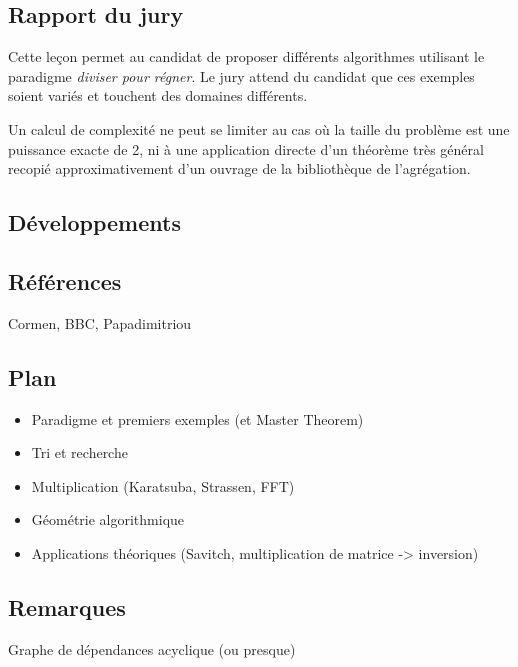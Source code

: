 \documentclass[../../agregation.tex]{subfiles}
\begin{document}

\subsection{Rapport du jury}

\begin{aquote}{}
Cette leçon permet au candidat de proposer différents algorithmes utilisant le paradigme \emph{diviser pour régner}. Le jury attend du candidat que ces exemples soient variés et touchent des domaines différents.

Un calcul de complexité ne peut se limiter au cas où la taille du problème est une puissance exacte de 2, ni à une application directe d'un théorème très général recopié approximativement d'un ouvrage de la bibliothèque de l'agrégation.
\end{aquote}

\subsection{Développements}

\dvts

\subsection{Références}

Cormen, BBC, Papadimitriou

\subsection{Plan}

\begin{itemize}
	\item Paradigme et premiers exemples (et Master Theorem)
	\item Tri et recherche
	\item Multiplication (Karatsuba, Strassen, FFT)
	\item Géométrie algorithmique
	\item Applications théoriques (Savitch, multiplication de matrice -> inversion)
\end{itemize}

\subsection{Remarques}

Graphe de dépendances acyclique (ou presque)
\end{document}
